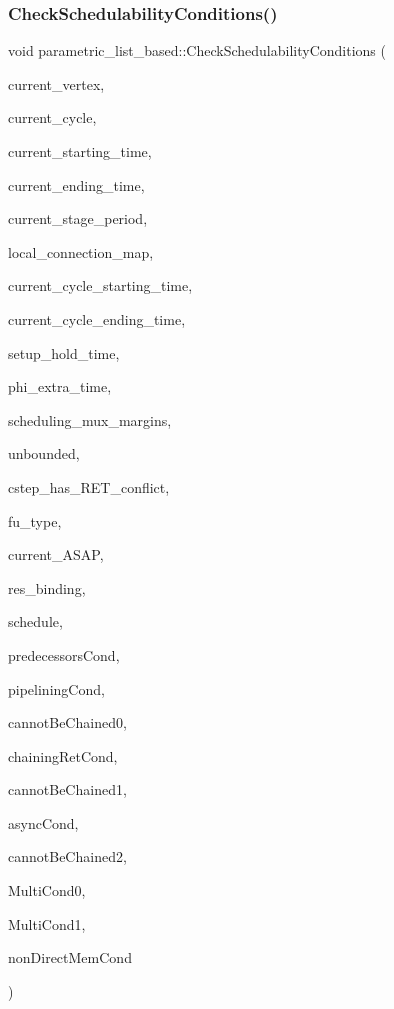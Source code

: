 \subsubsection{\texorpdfstring{Check\+Schedulability\+Conditions()}{CheckSchedulabilityConditions()}}
{\footnotesize\ttfamily void parametric\+\_\+list\+\_\+based\+::\+Check\+Schedulability\+Conditions (\begin{DoxyParamCaption}\item[{const \hyperlink{graph_8hpp_abefdcf0544e601805af44eca032cca14}{vertex} \&}]{current\+\_\+vertex,  }\item[{Control\+Step}]{current\+\_\+cycle,  }\item[{double \&}]{current\+\_\+starting\+\_\+time,  }\item[{double \&}]{current\+\_\+ending\+\_\+time,  }\item[{double \&}]{current\+\_\+stage\+\_\+period,  }\item[{\hyperlink{custom__map_8hpp_a18ca01763abbe3e5623223bfe5aaac6b}{Custom\+Map}$<$ std\+::pair$<$ unsigned int, unsigned int $>$, double $>$ \&}]{local\+\_\+connection\+\_\+map,  }\item[{double}]{current\+\_\+cycle\+\_\+starting\+\_\+time,  }\item[{double}]{current\+\_\+cycle\+\_\+ending\+\_\+time,  }\item[{double}]{setup\+\_\+hold\+\_\+time,  }\item[{double \&}]{phi\+\_\+extra\+\_\+time,  }\item[{double}]{scheduling\+\_\+mux\+\_\+margins,  }\item[{bool}]{unbounded,  }\item[{bool}]{cstep\+\_\+has\+\_\+\+R\+E\+T\+\_\+conflict,  }\item[{unsigned int}]{fu\+\_\+type,  }\item[{const \hyperlink{structvertex2obj}{vertex2obj}$<$ Control\+Step $>$ \&}]{current\+\_\+\+A\+S\+AP,  }\item[{const \hyperlink{fu__binding_8hpp_a619181df8ab98d7b7e17de58ac44b065}{fu\+\_\+binding\+Ref}}]{res\+\_\+binding,  }\item[{const \hyperlink{schedule_8hpp_af67f402958b3b52a1ec5cc4ce08ae3b9}{Schedule\+Ref}}]{schedule,  }\item[{bool \&}]{predecessors\+Cond,  }\item[{bool \&}]{pipelining\+Cond,  }\item[{bool \&}]{cannot\+Be\+Chained0,  }\item[{bool \&}]{chaining\+Ret\+Cond,  }\item[{bool \&}]{cannot\+Be\+Chained1,  }\item[{bool \&}]{async\+Cond,  }\item[{bool \&}]{cannot\+Be\+Chained2,  }\item[{bool \&}]{Multi\+Cond0,  }\item[{bool \&}]{Multi\+Cond1,  }\item[{bool \&}]{non\+Direct\+Mem\+Cond }\end{DoxyParamCaption})\hspace{0.3cm}{\ttfamily [private]}}



